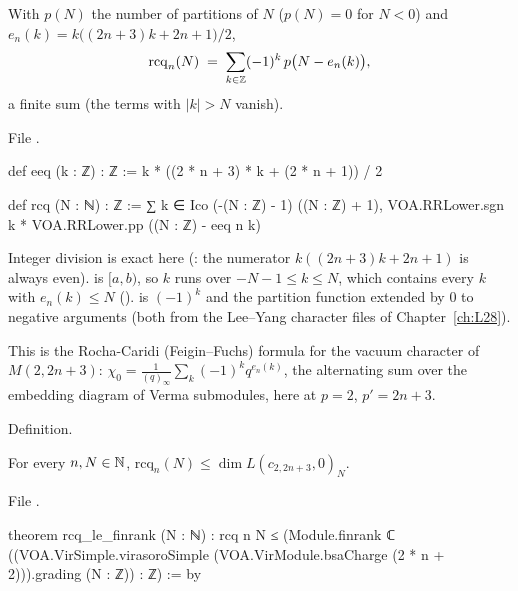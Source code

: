 \begin{definition}\label{l29:def:rcq}
With $p(N)$ the number of partitions of $N$ ($p(N)=0$ for $N<0$) and $e_n(k)=k\bigl((2n+3)k+2n+1\bigr)/2$,
\begin{equation*}
\mathrm{rcq}_n(N)\;=\;\sum_{k\in{\mathbb{Z}}}(-1)^k\,p\bigl(N-e_n(k)\bigr),
\end{equation*}
a finite sum (the terms with $|k|>N$ vanish).
\end{definition}

\noindent File .
\begin{leancode}
def eeq (k : ℤ) : ℤ := k * ((2 * n + 3) * k + (2 * n + 1)) / 2

def rcq (N : ℕ) : ℤ := ∑ k ∈ Ico (-(N : ℤ) - 1) ((N : ℤ) + 1), VOA.RRLower.sgn k * VOA.RRLower.pp ((N : ℤ) - eeq n k)
\end{leancode}

\begin{dictionary}
Integer division  is exact here (: the numerator $k((2n+3)k+2n+1)$ is always even).
 is $[a,b)$, so $k$ runs over $-N-1\le k\le N$, which contains every $k$ with $e_n(k)\le N$
().  is $(-1)^k$ and  the partition function extended by
$0$ to negative arguments (both from the Lee--Yang character files of Chapter~\ref{ch:L28}).
\end{dictionary}

\begin{physics}
This is the Rocha-Caridi (Feigin--Fuchs) formula for the vacuum character of $M(2,2n+3)$:
$\chi_0=\frac{1}{(q)_\infty}\sum_k(-1)^kq^{e_n(k)}$, the alternating sum over the embedding diagram of Verma
submodules, here at $p=2$, $p'=2n+3$.
\end{physics}

\begin{status}
Definition.
\end{status}

\begin{theorem}\label{l29:thm:rcq}
For every $n,N\in{\mathbb{N}}$, $\mathrm{rcq}_n(N)\le\dim L(c_{2,2n+3},0)_N$.
\end{theorem}

\noindent File .
\begin{leancode}
theorem rcq_le_finrank (N : ℕ) :
    rcq n N ≤ (Module.finrank ℂ ((VOA.VirSimple.virasoroSimple
      (VOA.VirModule.bsaCharge (2 * n + 2))).grading (N : ℤ)) : ℤ) := by
\end{leancode}

